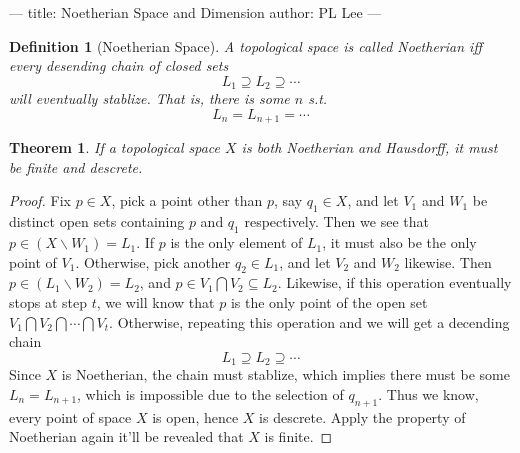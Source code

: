 ---
title: Noetherian Space and Dimension
author: PL Lee
---

\usepackage{amsmath}
\usepackage{amssymb}
\usepackage{amsthm}
\newtheorem{def}{Definition}
\newtheorem{thm}{Theorem}
\newtheorem{lem}{Lemma}
\newtheorem{prp}{Proposition}
\newtheorem{rem}{Remark}

\newcommand{\spec}[1]{\mathfrak{Spec}(#1)}



\begin{def}[Noetherian Space]
    A topological space is called Noetherian iff every desending chain of closed sets
    \[ L_1\supseteq L_2\supseteq\cdots \]
    will eventually stablize. That is, there is some $n$ s.t.
    \[ L_n=L_{n+1}=\cdots \]
\end{def}

\begin{thm}
    If a topological space $X$ is both Noetherian and Hausdorff, it must be finite and descrete.
\end{thm}
\begin{proof}
    Fix $p\in X$, pick a point other than $p$, say $q_1\in X$, and let $V_1$ and $W_1$ be distinct open sets containing $p$ and $q_1$ respectively. Then we see that $p\in(X\backslash W_1)=L_1$. If $p$ is the only element of $L_1$, it must also be the only point of $V_1$. Otherwise, pick another $q_2\in L_1$, and let $V_2$ and $W_2$ likewise. Then $p\in(L_1\backslash W_2)=L_2$, and $p\in V_1\bigcap V_2\subseteq L_2$. Likewise, if this operation eventually stops at step $t$, we will know that $p$ is the only point of the open set $V_1\bigcap V_2\bigcap\cdots\bigcap V_t$. Otherwise, repeating this operation and we will get a decending chain
    \[ L_1\supseteq L_2\supseteq\cdots \]
    Since $X$ is Noetherian, the chain must stablize, which implies there must be some $L_n=L_{n+1}$, which is impossible due to the selection of $q_{n+1}$. Thus we know, every point of space $X$ is open, hence $X$ is descrete. Apply the property of Noetherian again it'll be revealed that $X$ is finite.
\end{proof}

